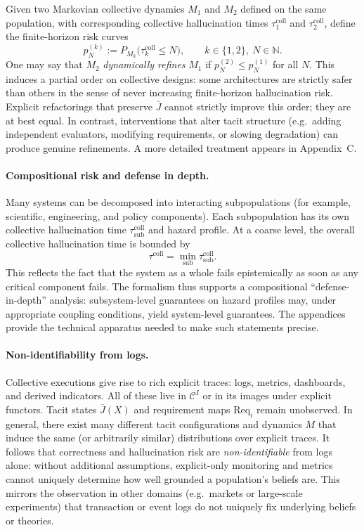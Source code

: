 \documentclass[11pt]{article}
\theoremstyle{definition}
\begin{document}
Given two Markovian collective dynamics $M_1$ and $M_2$ defined on the
same population, with corresponding collective hallucination times
$\tau^{\mathrm{coll}}_1$ and $\tau^{\mathrm{coll}}_2$, define the
finite-horizon risk curves
\[
  p_N^{(k)} := P_{M_k}\bigl(\tau^{\mathrm{coll}}_k \le N\bigr),
  \qquad k \in \{1,2\},\ N \in \mathbb{N}.
\]
One may say that $M_2$ \emph{dynamically refines} $M_1$ if
$p_N^{(2)} \le p_N^{(1)}$ for all $N$. This induces a partial order on
collective designs: some architectures are strictly safer than others in
the sense of never increasing finite-horizon hallucination risk. Explicit
refactorings that preserve $\overline{J}$ cannot strictly improve this
order; they are at best equal. In contrast, interventions that alter tacit
structure (e.g.\ adding independent evaluators, modifying requirements, or
slowing degradation) can produce genuine refinements. A more detailed
treatment appears in Appendix~C.

\paragraph{Compositional risk and defense in depth.}

Many systems can be decomposed into interacting subpopulations (for
example, scientific, engineering, and policy components). Each
subpopulation has its own collective hallucination time
$\tau^{\mathrm{coll}}_{\mathrm{sub}}$ and hazard profile. At a coarse
level, the overall collective hallucination time is bounded by
\[
  \tau^{\mathrm{coll}} = \min_{\mathrm{sub}}
  \tau^{\mathrm{coll}}_{\mathrm{sub}}.
\]
This reflects the fact that the system as a whole fails epistemically as
soon as any critical component fails. The formalism thus supports a
compositional ``defense-in-depth'' analysis: subsystem-level guarantees on
hazard profiles may, under appropriate coupling conditions, yield
system-level guarantees. The appendices provide the technical apparatus
needed to make such statements precise.

\paragraph{Non-identifiability from logs.}

Collective executions give rise to rich explicit traces: logs, metrics,
dashboards, and derived indicators. All of these live in
$\mathcal{C}^I$ or in its images under explicit functors. Tacit states
$\overline{J}(X)$ and requirement maps $\mathrm{Req}_i$ remain unobserved.
In general, there exist many different tacit configurations and dynamics
$M$ that induce the same (or arbitrarily similar) distributions over
explicit traces. It follows that correctness and hallucination risk are
\emph{non-identifiable} from logs alone: without additional assumptions,
explicit-only monitoring and metrics cannot uniquely determine how well
grounded a population's beliefs are. This mirrors the observation in other
domains (e.g.\ markets or large-scale experiments) that transaction or
event logs do not uniquely fix underlying beliefs or theories.
\end{document}
